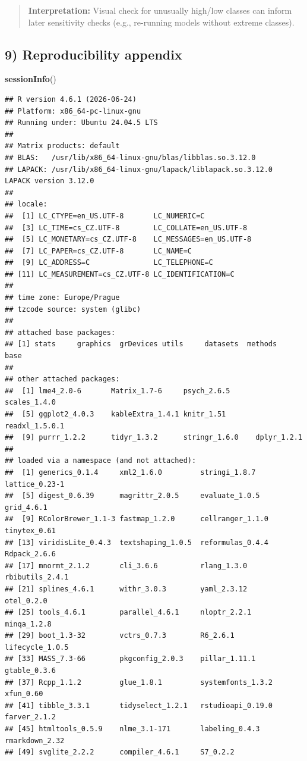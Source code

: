 \documentclass[
  10pt,
]{article}
\newenvironment{Shaded}{\begin{snugshade}}{\end{snugshade}}
\newcommand{\FunctionTok}[1]{\textcolor[rgb]{0.13,0.29,0.53}{\textbf{#1}}}
\newcommand{\NormalTok}[1]{#1}
\begin{document}
\begin{quote}
\textbf{Interpretation:} Visual check for unusually high/low classes can
inform later sensitivity checks (e.g., re-running models without extreme
classes).
\end{quote}

\hypertarget{reproducibility-appendix}{%
\subsection{9) Reproducibility
appendix}\label{reproducibility-appendix}}

\begin{Shaded}
\begin{Highlighting}[]
\FunctionTok{sessionInfo}\NormalTok{()}
\end{Highlighting}
\end{Shaded}

\begin{verbatim}
## R version 4.6.1 (2026-06-24)
## Platform: x86_64-pc-linux-gnu
## Running under: Ubuntu 24.04.5 LTS
##
## Matrix products: default
## BLAS:   /usr/lib/x86_64-linux-gnu/blas/libblas.so.3.12.0
## LAPACK: /usr/lib/x86_64-linux-gnu/lapack/liblapack.so.3.12.0  LAPACK version 3.12.0
##
## locale:
##  [1] LC_CTYPE=en_US.UTF-8       LC_NUMERIC=C
##  [3] LC_TIME=cs_CZ.UTF-8        LC_COLLATE=en_US.UTF-8
##  [5] LC_MONETARY=cs_CZ.UTF-8    LC_MESSAGES=en_US.UTF-8
##  [7] LC_PAPER=cs_CZ.UTF-8       LC_NAME=C
##  [9] LC_ADDRESS=C               LC_TELEPHONE=C
## [11] LC_MEASUREMENT=cs_CZ.UTF-8 LC_IDENTIFICATION=C
##
## time zone: Europe/Prague
## tzcode source: system (glibc)
##
## attached base packages:
## [1] stats     graphics  grDevices utils     datasets  methods   base
##
## other attached packages:
##  [1] lme4_2.0-6       Matrix_1.7-6     psych_2.6.5      scales_1.4.0
##  [5] ggplot2_4.0.3    kableExtra_1.4.1 knitr_1.51       readxl_1.5.0.1
##  [9] purrr_1.2.2      tidyr_1.3.2      stringr_1.6.0    dplyr_1.2.1
##
## loaded via a namespace (and not attached):
##  [1] generics_0.1.4     xml2_1.6.0         stringi_1.8.7      lattice_0.23-1
##  [5] digest_0.6.39      magrittr_2.0.5     evaluate_1.0.5     grid_4.6.1
##  [9] RColorBrewer_1.1-3 fastmap_1.2.0      cellranger_1.1.0   tinytex_0.61
## [13] viridisLite_0.4.3  textshaping_1.0.5  reformulas_0.4.4   Rdpack_2.6.6
## [17] mnormt_2.1.2       cli_3.6.6          rlang_1.3.0        rbibutils_2.4.1
## [21] splines_4.6.1      withr_3.0.3        yaml_2.3.12        otel_0.2.0
## [25] tools_4.6.1        parallel_4.6.1     nloptr_2.2.1       minqa_1.2.8
## [29] boot_1.3-32        vctrs_0.7.3        R6_2.6.1           lifecycle_1.0.5
## [33] MASS_7.3-66        pkgconfig_2.0.3    pillar_1.11.1      gtable_0.3.6
## [37] Rcpp_1.1.2         glue_1.8.1         systemfonts_1.3.2  xfun_0.60
## [41] tibble_3.3.1       tidyselect_1.2.1   rstudioapi_0.19.0  farver_2.1.2
## [45] htmltools_0.5.9    nlme_3.1-171       labeling_0.4.3     rmarkdown_2.32
## [49] svglite_2.2.2      compiler_4.6.1     S7_0.2.2
\end{verbatim}
\end{document}
